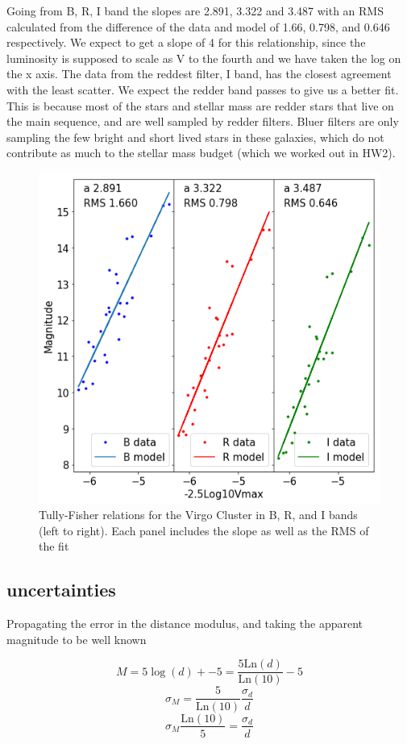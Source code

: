 \documentclass[12pt]{article}
\begin{document}
Going from B, R, I band the slopes are 2.891, 3.322 and 3.487 with an RMS calculated from the difference of the data and model of 1.66, 0.798, and 0.646 respectively. We expect to get a slope of 4 for this relationship, since the luminosity is supposed to scale as V to the fourth and we have taken the log on the x axis. The data from the reddest filter, I band, has the closest agreement with the least scatter. We expect the redder band passes to give us a better fit. This is because most of the stars and stellar mass are redder stars that live on the main sequence, and are well sampled by redder filters. Bluer filters are only sampling the few bright and short lived stars in these galaxies, which do not contribute as much to the stellar mass budget (which we worked out in HW2). 
\begin{figure}
\centering
\includegraphics[width=5in]{TF.png}
\caption{Tully-Fisher relations for the Virgo Cluster in B, R, and I bands (left to right). Each panel includes the slope as well as the RMS of the fit}
\end{figure}

\subsection{uncertainties}
Propagating the error in the distance modulus, and taking the apparent magnitude to be well known

$$M = 5\log(d) + -5 = \frac{5 \mathrm{Ln} (d)}{\mathrm{Ln} (10)} - 5$$
$$\sigma_{M} = \frac{5}{\mathrm{Ln} (10)} \frac{\sigma_{d}}{d}$$
$$\sigma_{M} \frac{\mathrm{Ln} (10)}{5} = \frac{\sigma_{d}}{d}$$
\end{document}
